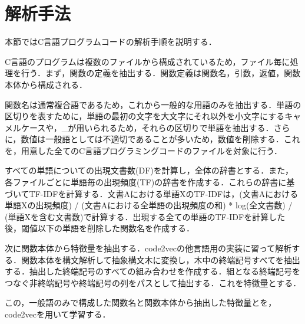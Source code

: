\documentclass[submit,techrep,noauthor]{ipsj}
\begin{document}
\section{解析手法}

本節ではC言語プログラムコードの解析手順を説明する．

C言語のプログラムは複数のファイルから構成されているため，ファイル毎に処理を行う．まず，関数の定義を抽出する．関数定義は関数名，引数，返値，関数本体から構成される．

関数名は通常複合語であるため，これから一般的な用語のみを抽出する．単語の区切りを表すために，単語の最初の文字を大文字にそれ以外を小文字にするキャメルケースや，\_が用いられるため，それらの区切りで単語を抽出する．さらに，数値は一般語としては不適切であることが多いため，数値を削除する．これを，用意した全てのC言語プログラミングコードのファイルを対象に行う．

すべての単語についての出現文書数(DF)を計算し，全体の辞書とする．また，各ファイルごとに単語毎の出現頻度(TF)の辞書を作成する．これらの辞書に基づいてTF-IDFを計算する．文書Aにおける単語XのTF-IDFは，{(文書Aにおける単語Xの出現頻度) / (文書Aにおける全単語の出現頻度の和)} * log{(全文書数) / (単語Xを含む文書数)}で計算する．出現する全ての単語のTF-IDFを計算した後，閾値以下の単語を削除した関数名を作成する．

次に関数本体から特徴量を抽出する．code2vecの他言語用の実装に習って解析する．関数本体を構文解析して抽象構文木に変換し，木中の終端記号すべてを抽出する．抽出した終端記号のすべての組み合わせを作成する．組となる終端記号をつなぐ非終端記号や終端記号の列をパスとして抽出する．これを特徴量とする．

この，一般語のみで構成した関数名と関数本体から抽出した特徴量とを，code2vecを用いて学習する．





\end{document}
